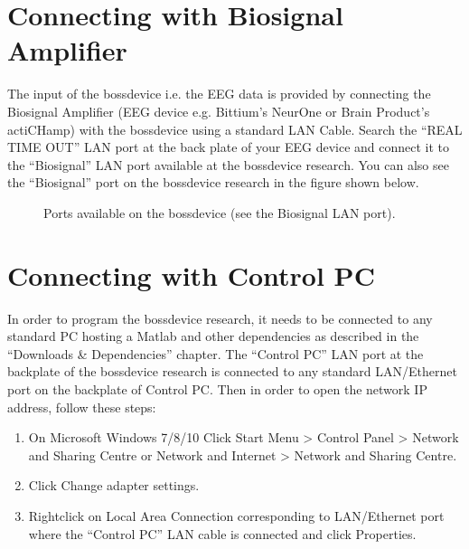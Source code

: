 \documentclass[letterpaper,10pt,english]{sphinxmanual}
\begin{document}
\section{Connecting with Biosignal Amplifier}
\label{\detokenize{2_setup_bossdevice_research:connecting-with-biosignal-amplifier}}
The input of the bossdevice i.e. the EEG data is provided by connecting the Biosignal Amplifier (EEG device e.g. Bittium’s NeurOne or Brain Product’s actiCHamp) with the bossdevice using a standard LAN Cable. Search the “REAL TIME OUT” LAN port at the back plate of your EEG device and connect it to the “Biosignal” LAN port available at the bossdevice research. You can also see the “Biosignal” port on the bossdevice research in the figure shown below.

\begin{figure}[htbp]
\centering
\capstart

\noindent{}
\caption{Ports available on the bossdevice (see the Biosignal LAN port).}\label{\detokenize{2_setup_bossdevice_research:id1}}\end{figure}


\section{Connecting with Control PC}
\label{\detokenize{2_setup_bossdevice_research:connecting-with-control-pc}}
In order to program the bossdevice research, it needs to be connected to any standard PC hosting a Matlab and other dependencies as described in the “Downloads \& Dependencies” chapter. The “Control PC” LAN port at the backplate of the bossdevice research is connected to any standard LAN/Ethernet port on the backplate of Control PC. Then in order to open the network IP address, follow these steps:
\begin{enumerate}
%
\item {} 
On Microsoft Windows 7/8/10 Click Start Menu \textgreater{} Control Panel \textgreater{} Network and Sharing Centre or Network and Internet \textgreater{} Network and Sharing Centre.

\item {} 
Click Change adapter settings.

\item {} 
Right\sphinxhyphen{}click on Local Area Connection corresponding to LAN/Ethernet port where the “Control PC” LAN cable is connected and click Properties.

\end{enumerate}
\end{document}
